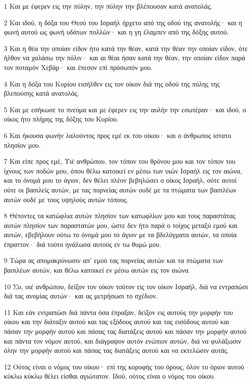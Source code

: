 \par 1 Και με έφερεν εις την πύλην, την πύλην την βλέπουσαν κατά ανατολάς.
\par 2 Και ιδού, η δόξα του Θεού του Ισραήλ ήρχετο από της οδού της ανατολής· και η φωνή αυτού ως φωνή υδάτων πολλών· και η γη έλαμπεν από της δόξης αυτού.
\par 3 Και η θέα την οποίαν είδον ήτο κατά την θέαν, κατά την θέαν την οποίαν είδον, ότε ήλθον να χαλάσω την πόλιν· και αι θέαι ήσαν κατά την θέαν, την οποίαν είδον παρά τον ποταμόν Χεβάρ· και έπεσον επί πρόσωπόν μου.
\par 4 Και η δόξα του Κυρίου εισήλθεν εις τον οίκον διά της οδού της πύλης της βλεπούσης κατά ανατολάς.
\par 5 Και με εσήκωσε το πνεύμα και με έφερεν εις την αυλήν την εσωτέραν· και ιδού, ο οίκος ήτο πλήρης της δόξης του Κυρίου.
\par 6 Και ήκουσα φωνήν λαλούντος προς εμέ εκ του οίκου· και ο άνθρωπος ίστατο πλησίον μου.
\par 7 Και είπε προς εμέ, Υιέ ανθρώπου, τον τόπον του θρόνου μου και τον τόπον του ίχνους των ποδών μου, όπου θέλω κατοικεί εν μέσω των υιών Ισραήλ εις τον αιώνα, και το όνομά μου το άγιον, δεν θέλει πλέον βεβηλώσει ο οίκος Ισραήλ, ούτε αυτοί ούτε οι βασιλείς αυτών, με τας πορνείας αυτών ουδέ με τα πτώματα των βασιλέων αυτών ουδέ με τους υψηλούς αυτών τόπους.
\par 8 Θέτοντες τα κατώφλια αυτών πλησίον των κατωφλίων μου και τους παραστάτας αυτών πλησίον των παραστατών μου, ώστε δεν ήτο παρά ο τοίχος μεταξύ εμού και αυτών, εβεβήλουν ούτω το όνομά μου το άγιον με τα βδελύγματα αυτών, τα οποία έπραττον· διά τούτο ηνάλωσα αυτούς εν τω θυμώ μου.
\par 9 Τώρα ας απομακρύνωσιν απ' εμού τας πορνείας αυτών και τα πτώματα των βασιλέων αυτών, και θέλω κατοικεί εν μέσω αυτών εις τον αιώνα.
\par 10 Συ, υιέ ανθρώπου, δείξον τον οίκον τούτον εις τον οίκον Ισραήλ, διά να εντραπώσι διά τας ανομίας αυτών· και ας μετρήσωσι το σχέδιον.
\par 11 Και εάν εντραπώσι διά πάντα όσα έπραξαν, δείξον εις αυτούς την μορφήν του οίκου και την διάταξιν αυτού και τας εξόδους αυτού και τας εισόδους αυτού και πάσαν την μορφήν αυτού και πάσας τας διατάξεις αυτού και πάσαν την μορφήν αυτού και πάντα τον νόμον αυτού, και διάγραψον αυτόν ενώπιον αυτών, διά να φυλάξωσιν όλην την μορφήν αυτού και πάσας τας διατάξεις αυτού και να εκτελώσιν αυτάς.
\par 12 Ούτος είναι ο νόμος του οίκου· επί της κορυφής του όρους, όλον το όριον αυτού κύκλω κύκλω θέλει είσθαι αγιώτατον. Ιδού, ούτος είναι ο νόμος του οίκου.
